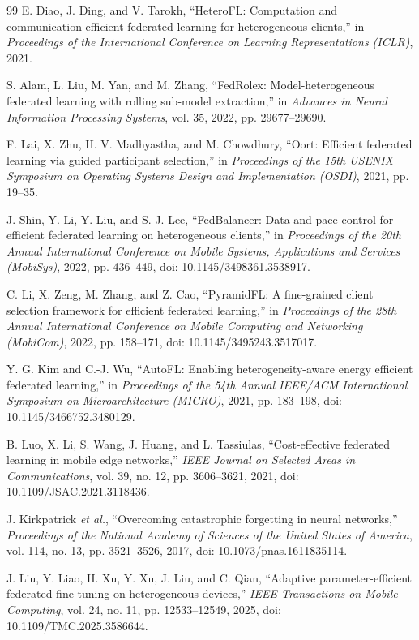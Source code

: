 \documentclass[10pt,conference,letterpaper]{IEEEtran}
\begin{document}
\begin{thebibliography}{99}
E. Diao, J. Ding, and V. Tarokh,
``HeteroFL: Computation and communication efficient federated learning for heterogeneous clients,''
in \emph{Proceedings of the International Conference on Learning Representations (ICLR)}, 2021.

S. Alam, L. Liu, M. Yan, and M. Zhang,
``FedRolex: Model-heterogeneous federated learning with rolling sub-model extraction,''
in \emph{Advances in Neural Information Processing Systems}, vol. 35, 2022, pp. 29677--29690.

F. Lai, X. Zhu, H. V. Madhyastha, and M. Chowdhury,
``Oort: Efficient federated learning via guided participant selection,''
in \emph{Proceedings of the 15th USENIX Symposium on Operating Systems Design and Implementation (OSDI)}, 2021, pp. 19--35.

J. Shin, Y. Li, Y. Liu, and S.-J. Lee,
``FedBalancer: Data and pace control for efficient federated learning on heterogeneous clients,''
in \emph{Proceedings of the 20th Annual International Conference on Mobile Systems, Applications and Services (MobiSys)}, 2022, pp. 436--449,
doi: 10.1145/3498361.3538917.

C. Li, X. Zeng, M. Zhang, and Z. Cao,
``PyramidFL: A fine-grained client selection framework for efficient federated learning,''
in \emph{Proceedings of the 28th Annual International Conference on Mobile Computing and Networking (MobiCom)}, 2022, pp. 158--171,
doi: 10.1145/3495243.3517017.

Y. G. Kim and C.-J. Wu,
``AutoFL: Enabling heterogeneity-aware energy efficient federated learning,''
in \emph{Proceedings of the 54th Annual IEEE/ACM International Symposium on Microarchitecture (MICRO)}, 2021, pp. 183--198,
doi: 10.1145/3466752.3480129.

B. Luo, X. Li, S. Wang, J. Huang, and L. Tassiulas,
``Cost-effective federated learning in mobile edge networks,''
\emph{IEEE Journal on Selected Areas in Communications}, vol. 39, no. 12, pp. 3606--3621, 2021,
doi: 10.1109/JSAC.2021.3118436.

J. Kirkpatrick \emph{et al.},
``Overcoming catastrophic forgetting in neural networks,''
\emph{Proceedings of the National Academy of Sciences of the United States of America}, vol. 114, no. 13, pp. 3521--3526, 2017,
doi: 10.1073/pnas.1611835114.

J. Liu, Y. Liao, H. Xu, Y. Xu, J. Liu, and C. Qian,
``Adaptive parameter-efficient federated fine-tuning on heterogeneous devices,''
\emph{IEEE Transactions on Mobile Computing}, vol. 24, no. 11, pp. 12533--12549, 2025,
doi: 10.1109/TMC.2025.3586644.


\end{thebibliography}
\end{document}
